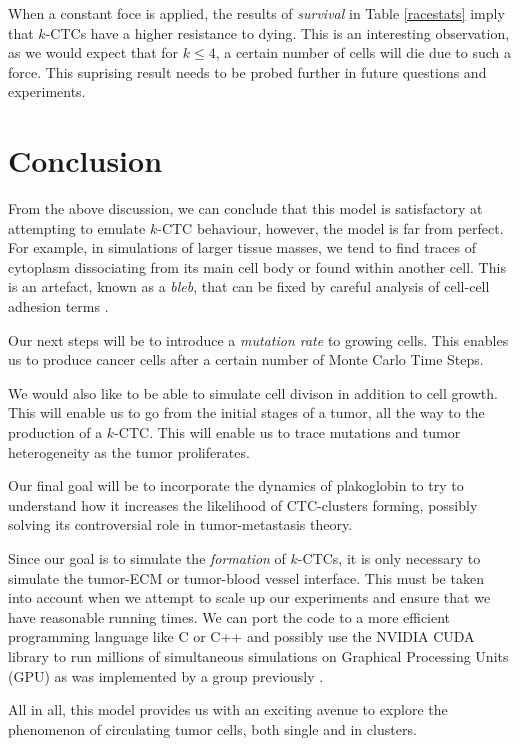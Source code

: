 \documentclass[12pt]{article}
\begin{document}
When a constant foce is applied, the results of \emph{survival} in Table \ref{racestats} imply that $k$-CTCs have a higher resistance to dying. This is an interesting observation, as  we would expect that for $k\leq4$, a certain number of cells will die due to such a force. This suprising result needs to be probed further in future questions and experiments.

\section{Conclusion}

From the above discussion, we can conclude that this model is satisfactory at attempting to emulate $k$-CTC behaviour, however, the model is far from perfect. For example, in simulations of larger tissue masses, we tend to find traces of cytoplasm dissociating from its main cell body or found within another cell. This is an artefact, known as a \emph{bleb}, that can be fixed by careful analysis of cell-cell adhesion terms \cite{Glazier2007}.

Our next steps will be to introduce a \emph{mutation rate} to growing cells. This enables us to produce cancer cells after a certain number of Monte Carlo Time Steps.

We would also like to be able to simulate cell divison in addition to cell growth. This will enable us to go from the initial stages of a tumor, all the way to the production of a $k$-CTC. This will enable us to trace mutations and tumor heterogeneity as the tumor proliferates.

Our final goal will be to incorporate the dynamics of plakoglobin to try to understand how it increases the likelihood of CTC-clusters forming, possibly solving its controversial role in tumor-metastasis theory.

Since our goal is to simulate the \emph{formation} of $k$-CTCs, it is only necessary to simulate the tumor-ECM or tumor-blood vessel interface. This must be taken into account when we attempt to scale up our experiments and ensure that we have reasonable running times. We can port the code to a more efficient programming language like C or C++ and possibly use the NVIDIA CUDA library to run millions of simultaneous simulations on Graphical Processing Units (GPU) as was implemented by a group previously \cite{Tapia2011}. 

All in all, this model provides us with an exciting avenue to explore the phenomenon of circulating tumor cells, both single and in clusters. 
\end{document}
